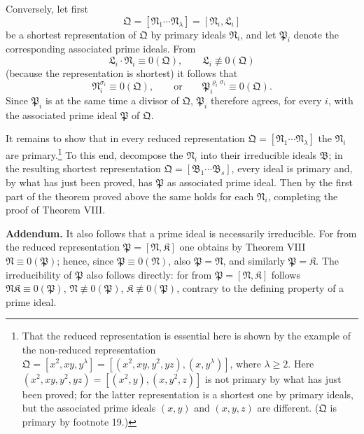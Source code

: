 \documentclass[11pt]{article}
\providecommand{\ideal}[1]{\mathfrak{#1}}
\begin{document}
Conversely, let first
\[
 \ideal Q=[\ideal N_1\cdots\ideal N_\lambda]=[\ideal N_i,\ideal L_i]
\]
be a shortest representation of $\ideal Q$ by primary ideals $\ideal N_i$, and let $\ideal P_i$ denote the corresponding associated prime ideals. From
\[
 \ideal L_i\cdot\ideal N_i\equiv0(\ideal Q),\qquad
 \ideal L_i\not\equiv0(\ideal Q)
\]
(because the representation is shortest) it follows that
\[
 \ideal N_i^{\sigma_i}\equiv0(\ideal Q),\qquad
 \text{or}\qquad
 \ideal P_i^{\varrho_i\sigma_i}\equiv0(\ideal Q).
\]
Since $\ideal P_i$ is at the same time a divisor of $\ideal Q$, $\ideal P_i$ therefore agrees, for every $i$, with the associated prime ideal $\ideal P$ of $\ideal Q$.

It remains to show that in every reduced representation $\ideal Q=[\ideal N_1\cdots\ideal N_\lambda]$ the $\ideal N_i$ are primary.\footnote{That the reduced representation is essential here is shown by the example of the non-reduced representation $\ideal Q=[x^2,xy,y^\lambda]=[(x^2,xy,y^2,yz),(x,y^\lambda)]$, where $\lambda\ge2$. Here $(x^2,xy,y^2,yz)=[(x^2,y),(x,y^2,z)]$ is not primary by what has just been proved; for the latter representation is a shortest one by primary ideals, but the associated prime ideals $(x,y)$ and $(x,y,z)$ are different. ($\ideal Q$ is primary by footnote 19.)} To this end, decompose the $\ideal N_i$ into their irreducible ideals $\ideal B$; in the resulting shortest representation $\ideal Q=[\ideal B_1\cdots\ideal B_s]$, every ideal is primary and, by what has just been proved, has $\ideal P$ as associated prime ideal. Then by the first part of the theorem proved above the same holds for each $\ideal N_i$, completing the proof of Theorem VIII.

\textbf{Addendum.} It also follows that a prime ideal is necessarily irreducible. For from the reduced representation $\ideal P=[\ideal N,\ideal K]$ one obtains by Theorem VIII $\ideal N\equiv0(\ideal P)$; hence, since $\ideal P\equiv0(\ideal N)$, also $\ideal P=\ideal N$, and similarly $\ideal P=\ideal K$. The irreducibility of $\ideal P$ also follows directly: for from $\ideal P=[\ideal N,\ideal K]$ follows $\ideal N\ideal K\equiv0(\ideal P)$, $\ideal N\not\equiv0(\ideal P)$, $\ideal K\not\equiv0(\ideal P)$, contrary to the defining property of a prime ideal.
\end{document}
